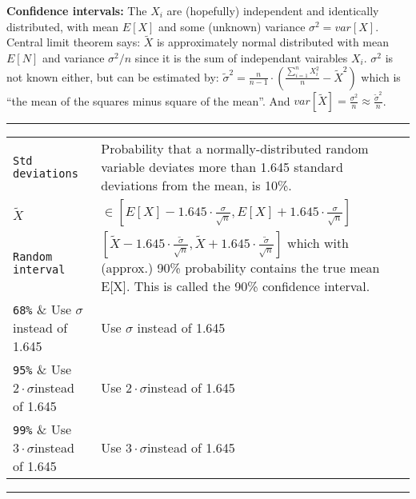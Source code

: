 \textbf{Confidence intervals:} The $X_i$ are (hopefully) independent and identically distributed, with mean $E[X]$ and some (unknown) variance $\sigma^{2} = var[X]$.
Central limit theorem says: $\widetilde{X}$ is approximately normal distributed with mean $E[N]$ and variance $\sigma^{2} / n$ since it is the sum of independant vairables $X_{i}$. $\sigma^2$ is not known either, but can be estimated by: $\widetilde{\sigma}^{2} = \frac{n}{n-1} \cdot (\frac{\sum_{i=1}^{n} X_{i}^{2}}{n} - \widetilde{X}^{2})$ which is “the mean of the squares minus square of the mean”. And $var[\widetilde{X}] = \frac{\sigma^{2}}{n} \approx \frac{\widetilde{\sigma}^{2}}{n}$.

\hrule
{}
\begin{tabular}{@{}p{\the\MyLen}@{}p{\linewidth-\the\MyLen}@{}}
\verb!Std deviations!	& Probability that a normally-distributed random variable deviates more than 1.645 standard deviations from the mean, is 10\%.\\
$\widetilde{X}$			&	$\in [E[X] - 1.645 \cdot \frac{\sigma}{\sqrt{n}}, E[X] + 1.645 \cdot \frac{\sigma}{\sqrt{n}}]$\\
\verb!Random interval!			&	$[\widetilde{X} - 1.645 \cdot \frac{\widetilde{\sigma}}{\sqrt{n}}, \widetilde{X} + 1.645 \cdot \frac{\widetilde{\sigma}}{\sqrt{n}}]$ which with (approx.) 90\% probability contains the true mean E[X]. This is called the 90\% confidence interval.\\
\verb!68%!			&	Use $\sigma$ instead of 1.645\\
\verb!95%!			&	Use $2 \cdot \sigma$instead of 1.645\\
\verb!99%!			&	Use $3 \cdot \sigma$instead of 1.645\\
\end{tabular}
\hrule


